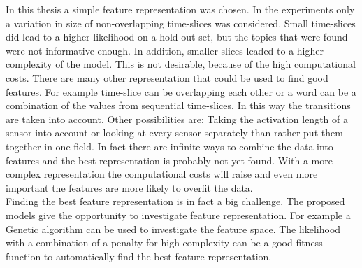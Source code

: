 In this thesis a simple feature representation was chosen. In the experiments only a variation in size of non-overlapping time-slices was considered. Small time-slices did lead to a higher likelihood on a hold-out-set, but the topics that were found were not informative enough. In addition, smaller slices leaded to a higher complexity of the model. This is not desirable, because of the high computational costs.
There are many other representation that could be used to find good features. For example time-slice can be overlapping each other or a word can be a combination of the values from sequential time-slices. In this way the transitions are taken into account. Other possibilities are: Taking the activation length of a sensor into account or looking at every sensor separately than rather put them together in one field. In fact there are infinite ways to combine the data into features and the best representation is probably not yet found. With a more complex representation the computational costs will raise and even more important the features are more likely to overfit the data.\\

Finding the best feature representation is in fact a big challenge. The proposed models give the opportunity to investigate feature representation. For example a Genetic algorithm can be used to investigate the feature space. The likelihood with a combination of a penalty for high complexity can be a good fitness function to automatically find the best feature representation.













